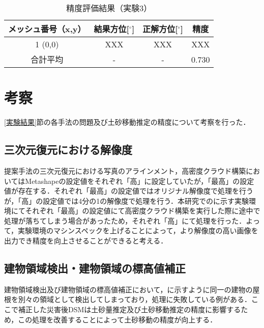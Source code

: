     \begin{table}[tbp]
      \centering
      \caption{精度評価結果（実験3）}
      \label{精度評価結果（実験3）}
      \begin{tabular}{cccc}
        \hline
        \textbf{メッシュ番号（x,y）} & \textbf{結果方位[$^{\circ}$]} & \textbf{正解方位[$^{\circ}$]} & \textbf{精度} \\
        \hline  \hline
        1  (0,0)  & XXX & XXX & XXX \\
        合計平均 & - & - & 0.730 \\
        \hline
      \end{tabular}
    \end{table}



  \section{考察}
    \label{考察}
    \ref{実験結果}節の各手法の問題及び土砂移動推定の精度について考察を行った．


    \subsection*{三次元復元における解像度}
      提案手法の三次元復元における写真のアラインメント，高密度クラウド構築においてはMetashapeの設定値をそれぞれ「高」に設定していたが，「最高」の設定値が存在する．それぞれ「最高」の設定値ではオリジナル解像度で処理を行うが，「高」の設定値では4分の1の解像度で処理を行う．本研究でのに示す実験環境にてそれぞれ「最高」の設定値にて高密度クラウド構築を実行した際に途中で処理が落ちてしまう場合があったため，それぞれ「高」にて処理を行った．よって，実験環境のマシンスペックを上げることによって，より解像度の高い画像を出力でき精度を向上させることができると考える．


    \subsection*{建物領域検出・建物領域の標高値補正}
      建物領域検出及び建物領域の標高値補正において，に示すように同一の建物の屋根を別々の領域として検出してしまっており，処理に失敗している例がある．ここで補正した災害後DSMは土砂量推定及び土砂移動推定の精度に影響するため，この処理を改善することによって土砂移動の精度が向上する．
      
